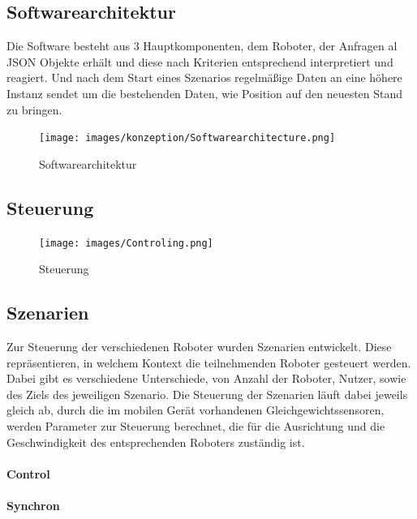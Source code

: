 \newpage
\subsection{Softwarearchitektur}

Die Software besteht aus 3 Hauptkomponenten, dem Roboter, der Anfragen al JSON Objekte erhält und diese nach Kriterien entsprechend interpretiert und reagiert. Und nach dem Start eines Szenarios regelmäßige Daten an eine höhere Instanz sendet um die bestehenden Daten, wie Position auf den neuesten Stand zu bringen. 

\newpage
\begin{figure}[h]
	\centering
	\texttt{[image: images/konzeption/Softwarearchitecture.png]}
	\caption{Softwarearchitektur}
	\label{fig:softwarearchitecture}
\end{figure}

\newpage
\subsection{Steuerung}

\begin{figure}[h]
	\centering
	\texttt{[image: images/Controling.png]}
	\caption{Steuerung}
	\label{fig:steuerung}
\end{figure}

\subsection{Szenarien}

Zur Steuerung der verschiedenen Roboter wurden Szenarien entwickelt. Diese repräsentieren, in welchem Kontext die teilnehmenden Roboter gesteuert werden. Dabei gibt es verschiedene Unterschiede, von Anzahl der Roboter, Nutzer, sowie des Ziels des jeweiligen Szenario. Die Steuerung der Szenarien läuft dabei jeweils gleich ab, durch die im mobilen Gerät vorhandenen Gleichgewichtssensoren, werden Parameter zur Steuerung berechnet, die für die Ausrichtung und die Geschwindigkeit des entsprechenden Roboters zuständig ist.





\paragraph{Control}



\paragraph{Synchron}
